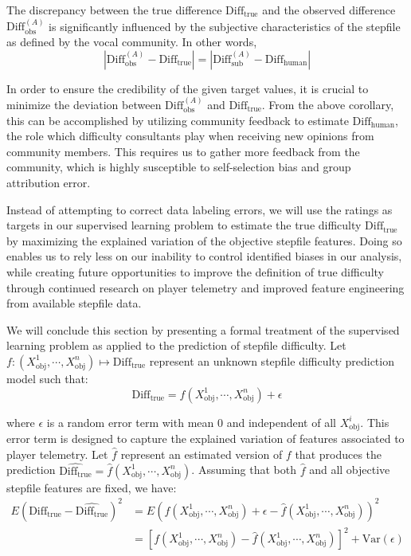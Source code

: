 \begin{corollary}
The discrepancy between the true difference $\text{Diff}_{\text{true}}$ and the observed difference $\text{Diff}_{\text{obs}}^{(A)}$ is significantly influenced by the subjective characteristics of the stepfile as defined by the vocal community. In other words,
$$|\text{Diff}_{\text{obs}}^{(A)} - \text{Diff}_{\text{true}}| = |\text{Diff}_{\text{sub}}^{(A)} - \text{Diff}_{\text{human}}|$$
\end{corollary}

In order to ensure the credibility of the given target values, it is crucial to minimize the deviation between $\text{Diff}_{\text{obs}}^{(A)}$ and $\text{Diff}_{\text{true}}$. From the above corollary, this can be accomplished by utilizing community feedback to estimate $\text{Diff}_{\text{human}}$, the role which difficulty consultants play when receiving new opinions from community members. This requires us to gather more feedback from the community, which is highly susceptible to self-selection bias and group attribution error.

\vspace{2mm}

Instead of attempting to correct data labeling errors, we will use the ratings as targets in our supervised learning problem to estimate the true difficulty $\text{Diff}_{\text{true}}$ by maximizing the explained variation of the objective stepfile features. Doing so enables us to rely less on our inability to control identified biases in our analysis, while creating future opportunities to improve the definition of true difficulty through continued research on player telemetry and improved feature engineering from available stepfile data.
\vspace{2mm} 

We will conclude this section by presenting a formal treatment of the supervised learning problem as applied to the prediction of stepfile difficulty. Let $f: (X_{\text{obj}}^1, \cdots, X_{\text{obj}}^n) \mapsto \text{Diff}_{\text{true}}$ represent an unknown stepfile difficulty prediction model such that:
$$\text{Diff}_{\text{true}} = f(X_{\text{obj}}^1, \cdots, X_{\text{obj}}^n) + \epsilon$$

where $\epsilon$ is a random error term with mean $0$ and independent of all $X_{\text{obj}}^i$. \cite{james2023introduction} This error term is designed to capture the explained variation of features associated to player telemetry. Let $\hat{f}$ represent an estimated version of $f$ that produces the prediction $\hat{\text{Diff}_{\text{true}}} = \hat{f}(X_{\text{obj}}^1, \cdots, X_{\text{obj}}^n)$. Assuming that both $\hat{f}$ and all objective stepfile features are fixed, we have:
\begin{align*}
    E(\text{Diff}_{\text{true}} - \hat{\text{Diff}_{\text{true}}})^2 & = E(f(X_{\text{obj}}^1, \cdots, X_{\text{obj}}^n) + \epsilon - \hat{f}(X_{\text{obj}}^1, \cdots, X_{\text{obj}}^n))^2 \\
    & = [f(X_{\text{obj}}^1, \cdots, X_{\text{obj}}^n) - \hat{f}(X_{\text{obj}}^1, \cdots, X_{\text{obj}}^n)]^2 + \text{Var}(\epsilon)
\end{align*}

